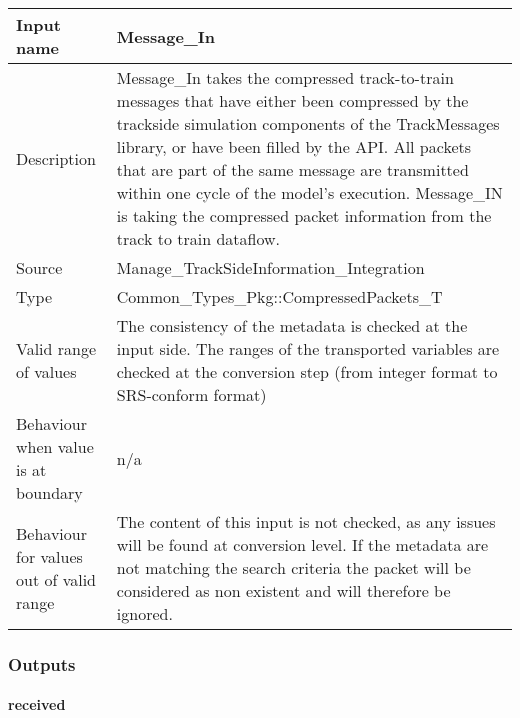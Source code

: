 \begin{longtable}{p{}p{}}
\toprule
Input name				&Message\_In \\
\midrule
Description				& Message\_In takes the compressed track-to-train messages that have either been compressed by the trackside simulation components of the TrackMessages library, or have been filled by the API. All packets that are part of the same message are transmitted within one cycle of the model's execution. Message\_IN is taking the compressed packet information from the track to train dataflow. \newline
  \\
\midrule
Source					& Manage\_TrackSideInformation\_Integration \\ 
\midrule
Type					& Common\_Types\_Pkg::CompressedPackets\_T \\
\midrule
Valid range of values 	& The consistency of the metadata is checked at the input side. The ranges of the transported variables are checked at the conversion step (from integer format to SRS-conform format)
 \\
\midrule
Behaviour when value is at boundary	& n/a \\
\midrule
Behaviour for values out of valid range	& The content of this input is not checked, as any issues will be found at conversion level. If the metadata are not matching the search criteria the packet will be considered as non existent and will therefore be ignored. 
 \\
\bottomrule
\end{longtable}




\subsubsection{Outputs}\label{s:trackside_outputs}

\paragraph{received}


